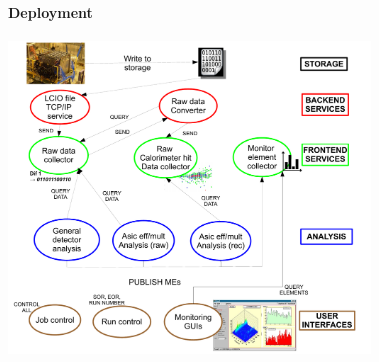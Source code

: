 \documentclass[8pt]{beamer}
\begin{document}
  
  \begin{frame}
  \frametitle{\secname}
  \framesubtitle{Deployment}
  
  \centering \includegraphics[width=0.72\textwidth]{figs/DQM4HEP_DEPLOYEMENT_TEST.pdf}
  
  \end{frame}
  
\end{document}
